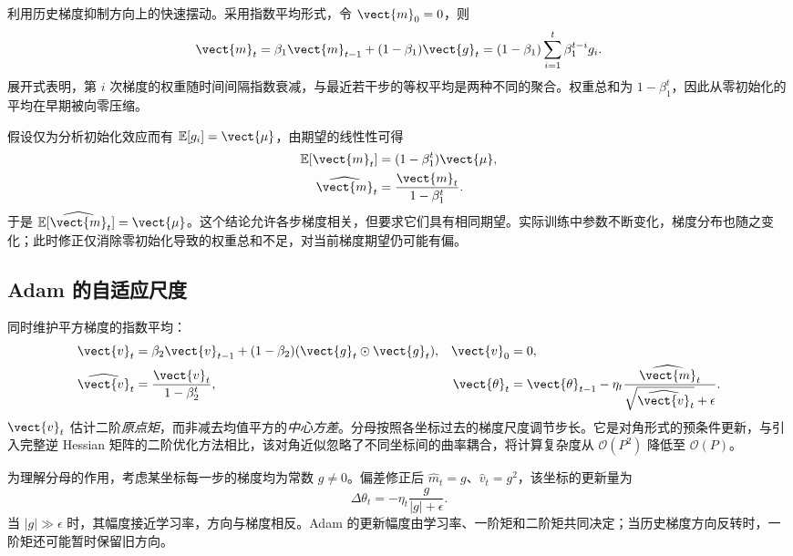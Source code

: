 \documentclass[../textbook.tex]{subfiles}
\begin{document}
利用历史梯度抑制方向上的快速摆动。采用指数平均形式，令 $\vect{m}_0=0$，则
\begin{equation}
 \vect{m}_t=\beta_1\vect{m}_{t-1}+(1-\beta_1)\vect{g}_t
 =(1-\beta_1)\sum_{i=1}^t\beta_1^{t-i}g_i.
 \label{eq:stability-first-moment}
\end{equation}
展开式表明，第 $i$ 次梯度的权重随时间间隔指数衰减，与最近若干步的等权平均是两种不同的聚合。权重总和为 $1-\beta_1^t$，因此从零初始化的平均在早期被向零压缩。

假设仅为分析初始化效应而有 $\mathbb E[g_i]=\vect{\mu}$，由期望的线性性可得
\begin{equation}\label{eq:stability-bias-correction}
\begin{aligned}
 \mathbb E[\vect{m}_t] &= (1-\beta_1^t)\vect{\mu}, \\
 \widehat{\vect{m}}_t &= \frac{\vect{m}_t}{1-\beta_1^t}.
\end{aligned}
\end{equation}
于是 $\mathbb E[\widehat{\vect{m}}_t]=\vect{\mu}$。这个结论允许各步梯度相关，但要求它们具有相同期望。实际训练中参数不断变化，梯度分布也随之变化；此时修正仅消除零初始化导致的权重总和不足，对当前梯度期望仍可能有偏。

\subsection{Adam 的自适应尺度}
同时维护平方梯度的指数平均\autocite{kingma2015adam}：
\begin{align}
 \vect{v}_t&=\beta_2\vect{v}_{t-1}+(1-\beta_2)(\vect{g}_t\odot \vect{g}_t),&\vect{v}_0&=0,\\
 \widehat{\vect{v}}_t&=\frac{\vect{v}_t}{1-\beta_2^t},&
 \vect{\theta}_t&=\vect{\theta}_{t-1}-\eta_t
 \frac{\widehat{\vect{m}}_t}{\sqrt{\widehat{\vect{v}}_t}+\epsilon}.
 \label{eq:stability-adam}
\end{align}
$\vect{v}_t$ 估计二阶\emph{原点矩}，而非减去均值平方的\emph{中心方差}。分母按照各坐标过去的梯度尺度调节步长。它是对角形式的预条件更新，与引入完整逆 Hessian 矩阵的二阶优化方法相比，该对角近似忽略了不同坐标间的曲率耦合，将计算复杂度从 $\mathcal{O}(P^2)$ 降低至 $\mathcal{O}(P)$。

为理解分母的作用，考虑某坐标每一步的梯度均为常数 $g\ne0$。偏差修正后 $\widehat m_t=g$、$\widehat v_t=g^2$，该坐标的更新量为
\begin{equation}
 \Delta\theta_t=-\eta_t\frac{g}{|g|+\epsilon}.
 \label{eq:stability-constant-gradient}
\end{equation}
当 $|g|\gg\epsilon$ 时，其幅度接近学习率，方向与梯度相反。Adam 的更新幅度由学习率、一阶矩和二阶矩共同决定；当历史梯度方向反转时，一阶矩还可能暂时保留旧方向。
\end{document}
